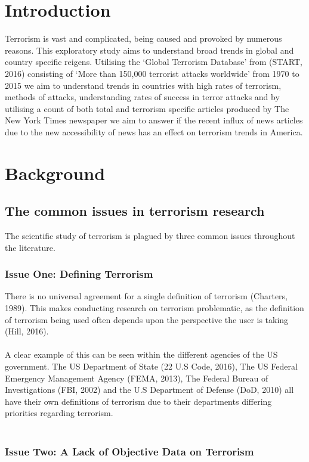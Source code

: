 \documentclass[10pt,a4paper]{article}
\begin{document}
\section{Introduction} 
Terrorism is vast and complicated, being caused and provoked by numerous reasons.  This exploratory study aims to understand broad trends in global and country specific reigens. Utilising the ‘Global Terrorism Database’ from (START, 2016) consisting of ‘More than 150,000 terrorist attacks worldwide’ from 1970 to 2015 we aim to understand trends in countries with high rates of terrorism, methods of attacks, understanding rates of success in terror attacks and by utilising a count of both total and terrorism specific  articles produced by The New York Times newspaper we aim to answer if the recent influx of news articles due to the new accessibility of news has an effect on terrorism trends in America.

\section{Background}
		\subsection{The common issues in terrorism research}
The scientific study of terrorism is plagued by three common issues throughout the literature.
			\subsubsection{Issue One: Defining Terrorism}
There is no universal agreement for a single definition of terrorism (Charters, 1989). This makes conducting research on terrorism problematic, as the definition of terrorism being used often depends upon the perspective the user is taking (Hill, 2016).   \\\\

A clear example of this can be seen within the different agencies of the US government. The US Department of State (22 U.S Code, 2016), The US Federal Emergency Management Agency (FEMA, 2013), The Federal Bureau of Investigations (FBI, 2002) and the U.S Department of Defense (DoD, 2010) all have their own definitions of terrorism due to their departments differing priorities regarding terrorism.    \\\\



			\subsubsection{Issue Two: A Lack of Objective Data on Terrorism}
\end{document}
